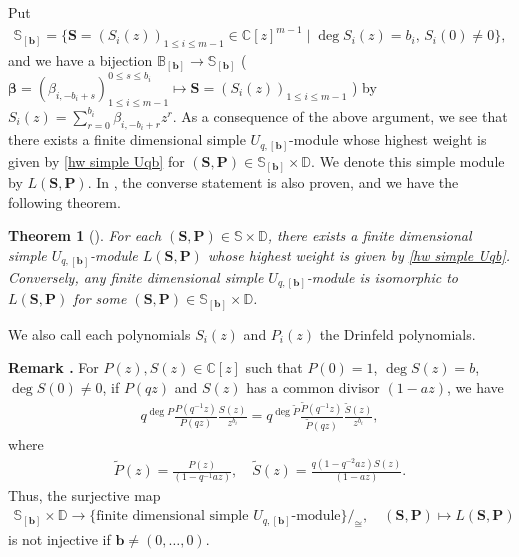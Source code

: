 \documentclass[12pt]{amsart}
\newtheorem{thm}{Theorem}[section]
\def \remark{\refstepcounter{thm} \par\medskip\noindent
                \textbf{Remark \thethm .} }
\numberwithin{equation}{thm}
\newcommand\BB{\mathbb B}
\newcommand\CC{\mathbb C}
\newcommand\DD{\mathbb D}
\renewcommand\SS{\mathbb S} %
\newcommand\bP{\mathbf P}
\newcommand\bS{\mathbf S}
\newcommand\bb{\mathbf b}
\renewcommand\b{\beta}   %
\newcommand\Bb{\boldsymbol\beta}
\newcommand\wt{\widetilde}
\newcommand\ra{\rightarrow}
\newcounter{ni}
\begin{document}
Put 
\begin{align*}
\SS_{[\bb]} = \{ \bS = (S_i(z))_{1\leq i \leq m-1} \in \CC[z]^{m-1} \mid 
	\deg S_i(z) = b_i, \, S_i(0) \not= 0 \}, 
\end{align*} 
and we have a bijection 
$\BB_{[\bb]} \ra \SS_{[\bb]} $ ($\Bb=(\b_{i,- b_i +s})^{0 \leq s \leq b_i}_{1 \leq i \leq m-1}  \mapsto \bS=(S_i(z))_{1\leq i \leq m-1}$ ) 
by $S_i(z) = \sum_{r=0}^{b_i} \b_{i, - b_i +r} z^r$. 
As a consequence of the above argument,  
we see that there exists a finite dimensional simple $U_{q,[\bb]}$-module whose highest weight is given by \eqref{hw simple Uqb} 
for $(\bS, \bP) \in \SS_{[\bb]} \times \DD$. 
We denote this simple module by $L(\bS, \bP)$. 
In \cite{Her23}, the converse statement is also proven, and we have the following theorem. 
\begin{thm}[{\cite[Theorem 6.5]{Her23}}] 
\label{Thm simple Uqb}
For each $(\bS, \bP) \in \SS \times \DD$, there exists a finite dimensional simple $U_{q,[\bb]}$-module $L(\bS, \bP)$ 
whose highest weight is given by \eqref{hw simple Uqb}. 
Conversely, any finite dimensional simple $U_{q,[\bb]}$-module is isomorphic to $L( \bS, \bP)$ 
for some $(\bS, \bP) \in \SS_{[\bb]} \times \DD$. 
\end{thm}

We also call  each polynomials $S_i(z)$ and $P_i(z)$  the Drinfeld polynomials. 

\remark 
\label{Rem DP} 
For $P(z), S(z) \in \CC[z]$ such that $P(0)=1$, $\deg S(z) = b$, $\deg S(0) \not=0$, 
if $P(qz)$ and $S(z)$ has a common divisor $(1 - az)$, 
we have 
\begin{align*}
q^{\deg P} \frac{ P (q^{-1} z)}{ P(qz)} \frac{ S(z)}{z^{b_i}} 
	= q^{\deg \wt{P}} \frac{ \wt{P} (q^{-1} z)}{ \wt{P} (q z)} \frac{ \wt{S}(z)}{z^{b_i}}, 
\end{align*}
where 
\begin{align*}
\wt{P} (z) = \frac{ P(z)}{(1- q^{-1} a z)}, 
\quad 
\wt{S}(z) = \frac{ q ( 1 - q^{-2} az) S(z)}{(1 - a z)}.
\end{align*}
Thus, the surjective map 
\begin{align*}
\SS_{[\bb]} \times \DD \ra \{ \text{finite dimensional simple $U_{q,[\bb]}$-module} \}/_{\cong}, 
\quad 
(\bS, \bP) \mapsto L(\bS, \bP)
\end{align*}
is not injective if $\bb\not= (0, \dots, 0)$. 


\end{document}

